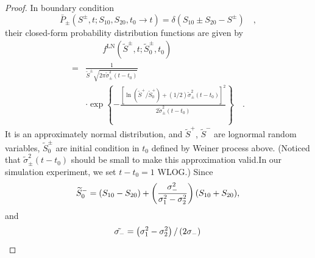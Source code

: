 \documentclass[letterpaper]{article} %
\begin{document}
\begin{appendices}
\begin{proof}
In boundary condition 
 \begin{equation*}
     \bar{P}_{\pm}\left(S^{\pm}, t ; S_{10}, S_{20}, t_{0} \longrightarrow t\right)=\delta\left(S_{10} \pm S_{20}-S^{\pm}\right) \quad,
 \end{equation*}
their closed-form probability distribution functions are given by 
  \begin{equation*}
  \begin{aligned}
     &\qquad f^{\mathrm{LN}}\left(\tilde{S}^{\pm}, t ; \tilde{S}_{0}^{\pm}, t_{0}\right)\\
     = &\frac{1}{\widetilde{S}^{\pm} \sqrt{2 \pi \tilde{\sigma}_{\pm}^{2}\left(t-t_{0}\right)}} \\
      &\cdot \exp \left\{-\frac{\left[\ln \left(\tilde{S}^{+} / \tilde{S}_{0}^{+}\right)+(1 / 2) \tilde{\sigma}_{\pm}^{2}\left(t-t_{0}\right)\right]^{2}}{2 \tilde{\sigma}_{\pm}^{2}\left(t-t_{0}\right)}\right\} \quad.
 \end{aligned}
 \end{equation*}
It is an approximately normal distribution, and $\tilde{S}^{+}$, $\tilde{S}^{-}$ are lognormal random variables, $\tilde{S}_{0}^{\pm}$ are initial condition in $t_0$ defined by Weiner process above. (Noticed that $\tilde{\sigma}_{\pm}^{2}\left(t-t_{0}\right)$ should be small to make this approximation valid.In our simulation experiment, we set $t-t_0=1$ WLOG.) Since
\begin{equation*}
\widetilde{S}_{0}^{-}=(S_{10}-S_{20})+\left(\frac{\sigma_{-}^{2}}{\sigma_{1}^{2}-\sigma_{2}^{2}}\right) (S_{10}+S_{20}),\\ 
\end{equation*}
and
\begin{equation*}
    \tilde{\sigma_-}=\left(\sigma_{1}^{2}-\sigma_{2}^{2}\right) /\left(2 \sigma_{-}\right)\\

\end{equation*}
\end{proof}
\end{appendices}
\end{document}
